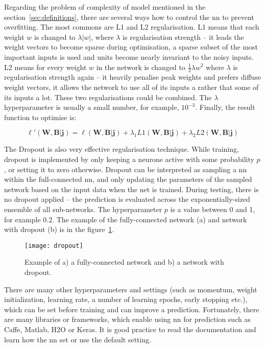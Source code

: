 \documentclass[thesis=M,english]{FITthesis}[2012/10/20]
\begin{document}
Regarding the problem of complexity of model mentioned in the section~\ref{sec:definitions}, there are several ways how to control the \gls{nn} to prevent overfitting. The most commons are L1 and L2 regularisation. L1  means that each weight $w$ is changed to $\lambda |w|$, where $\lambda$ is regularisation strength -- it leads the weight vectors to become sparse during optimisation, a sparse subset of the most important inputs is used and units become nearly invariant to the noisy inputs. L2 means for every weight $w$ in the network is changed to $\frac{1}{2}\lambda w^2$ where $\lambda$ is regularisation strength again -- it heavily penalise peak weights and prefers diffuse weight vectors, it allows the network to use all of its inputs a rather that some of its inputs a lot.\cite{Johnson2017ann_regularization} These two regularisations could be combined. The $\lambda$ hyperparameter is usually a small number, for example, $10^{-3}$. Finally, the result function to optimise is:

\begin{equation}
\ell'(\mathbf{W, B|j}) =  \ell(\mathbf{W, B|j}) + \lambda_1 L1(\mathbf{W, B|j}) + \lambda_2 L2(\mathbf{W, B|j})
\end{equation}

The Dropout is also very effective regularisation technique. While training, dropout is implemented by only keeping a neurone active with some probability $p$, or setting it to zero otherwise. Dropout can be interpreted as sampling a \gls{nn} within the full-connected \gls{nn}, and only updating the parameters of the sampled network based on the input data when the net is trained. During testing, there is no dropout applied -- the prediction is evaluated across the exponentially-sized ensemble of all sub-networks.\cite{Johnson2017ann_regularization} The hyperparameter $p$ is a value between 0 and 1, for example $0.2$. The example of the fully-connected network (a) and network with dropout (b) is in the figure~\ref{fig:dropout}.


\begin{figure}[ht]\centering
    \texttt{[image: dropout]}
    \caption{Example of a) a fully-connected network and b) a network with dropout.}\label{fig:dropout}
\end{figure}

There are many other hyperparameters and settings (such as momentum, weight initialization, learning rate, a number of learning epochs, early stopping etc.), which can be set before training and can improve a prediction. Fortunately, there are many libraries or frameworks, which enable using \gls{nn} for prediction such as Caffe\cite{caffe}, Matlab\cite{matlab}, H2O\cite{h2o_DL_booklet} or Keras\cite{keras_soft}. It is good practice to read the documentation and learn how the \gls{nn} set or use the default setting. 
\end{document}

